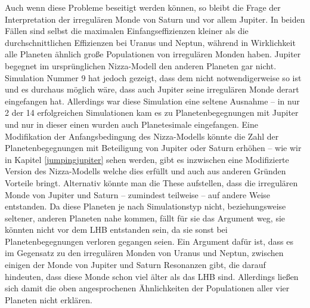 \documentclass[12pt,a4paper,twoside]{article}
\renewcommand{\cite}{\citep}
\begin{document}
Auch wenn diese Probleme beseitigt werden können, so bleibt die Frage der Interpretation der irregulären Monde von Saturn und vor allem Jupiter. In beiden Fällen sind selbst die maximalen Einfangseffizienzen kleiner als die durchschnittlichen Effizienzen bei Uranus und Neptun, %
während in Wirklichkeit alle Planeten ähnlich große Populationen von irregulären Monden haben\cite{Nesvorny2007}. %
Jupiter begegnet im ursprünglichen Nizza-Modell den anderen Planeten gar nicht.
Simulation Nummer 9 hat jedoch gezeigt, dass dem nicht notwendigerweise so ist und es durchaus möglich wäre, dass auch Jupiter seine irregulären Monde derart eingefangen hat.
Allerdings war diese Simulation eine seltene Ausnahme – in nur 2 der 14 erfolgreichen Simulationen kam es zu Planetenbegegnungen mit Jupiter und nur in dieser einen wurden auch Planetesimale eingefangen.
Eine Modifikation der Anfangsbedingung des Nizza-Modells könnte die Zahl der Planetenbegegnungen mit Beteiligung von Jupiter oder Saturn erhöhen -- wie wir in Kapitel \ref{jumpingjupiter} sehen werden, gibt es inzwischen eine Modifizierte Version des Nizza-Modells welche dies erfüllt und auch aus anderen Gründen Vorteile bringt.
Alternativ könnte man die These aufstellen, dass die irregulären Monde von Jupiter und Saturn – zumindest teilweise – auf andere Weise entstanden. Da diese Planeten je nach Simulationstyp nicht, beziehungsweise seltener, anderen Planeten nahe kommen, fällt für sie das Argument weg, sie könnten nicht vor dem LHB entstanden sein, da sie sonst bei Planetenbegegnungen verloren gegangen seien.
Ein Argument dafür ist, dass es im Gegensatz zu den irregulären Monden von Uranus und Neptun, zwischen einigen der Monde von Jupiter und Saturn Resonanzen gibt, die darauf hindeuten, dass diese Monde schon viel älter als das LHB sind\cite{Beauge2007,Nesvorny2007}.
Allerdings ließen sich damit die oben angesprochenen Ähnlichkeiten der Populationen aller vier Planeten nicht erklären.


\FloatBarrier
\end{document}

